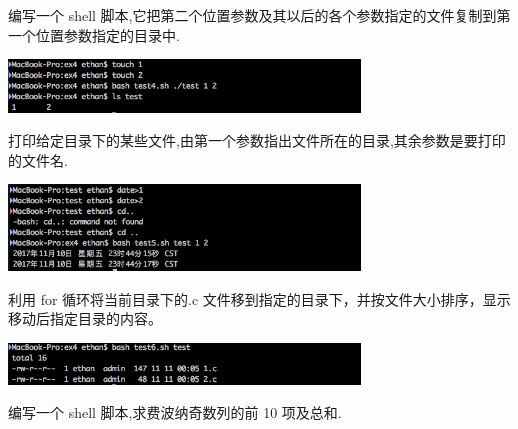 \documentclass{JNUexp}
\begin{document}
\begin{problem}
编写一个 shell 脚本,它把第二个位置参数及其以后的各个参数指定的文件复制到第一个位置参数指定的目录中.
\end{problem}

\begin{answer}
    
\end{answer}

\begin{image}
    \includegraphics[width=0.7\textwidth]{3}
\end{image}

\begin{problem}
    打印给定目录下的某些文件,由第一个参数指出文件所在的目录,其余参数是要打印的文件名.
\end{problem}

\begin{answer}
    
\end{answer}

\begin{image}
    \includegraphics[width=0.7\textwidth]{4}
\end{image}

\begin{problem}
    利用 for 循环将当前目录下的.c 文件移到指定的目录下，并按文件大小排序，显示移动后指定目录的内容。
\end{problem}

\begin{answer}
    
\end{answer}

\begin{image}
    \begin{center}
        \includegraphics[width=0.7\textwidth]{5}
    \end{center}
\end{image}
\begin{problem}
    编写一个 shell 脚本,求费波纳奇数列的前 10 项及总和.
\end{problem}
\end{document}

